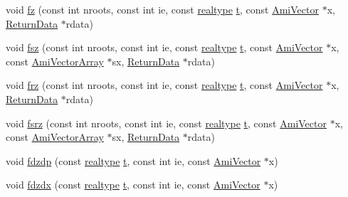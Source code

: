 \begin{DoxyCompactItemize}
void \mbox{\hyperlink{classamici_1_1_model_a34f0ec7e922c0817b08d0021dba9c36f}{fz}} (const int nroots, const int ie, const \mbox{\hyperlink{namespaceamici_a1bdce28051d6a53868f7ccbf5f2c14a3}{realtype}} \mbox{\hyperlink{classamici_1_1_model_a711281d57e9710226face29151cc4641}{t}}, const \mbox{\hyperlink{classamici_1_1_ami_vector}{Ami\+Vector}} $\ast$x, \mbox{\hyperlink{classamici_1_1_return_data}{Return\+Data}} $\ast$rdata)
\item 
void \mbox{\hyperlink{classamici_1_1_model_ae977a1364eb91b11b7a1f6f63c0c4547}{fsz}} (const int nroots, const int ie, const \mbox{\hyperlink{namespaceamici_a1bdce28051d6a53868f7ccbf5f2c14a3}{realtype}} \mbox{\hyperlink{classamici_1_1_model_a711281d57e9710226face29151cc4641}{t}}, const \mbox{\hyperlink{classamici_1_1_ami_vector}{Ami\+Vector}} $\ast$x, const \mbox{\hyperlink{classamici_1_1_ami_vector_array}{Ami\+Vector\+Array}} $\ast$sx, \mbox{\hyperlink{classamici_1_1_return_data}{Return\+Data}} $\ast$rdata)
\item 
void \mbox{\hyperlink{classamici_1_1_model_a8a033ace9618ccc4c72d2956f0bf79ac}{frz}} (const int nroots, const int ie, const \mbox{\hyperlink{namespaceamici_a1bdce28051d6a53868f7ccbf5f2c14a3}{realtype}} \mbox{\hyperlink{classamici_1_1_model_a711281d57e9710226face29151cc4641}{t}}, const \mbox{\hyperlink{classamici_1_1_ami_vector}{Ami\+Vector}} $\ast$x, \mbox{\hyperlink{classamici_1_1_return_data}{Return\+Data}} $\ast$rdata)
\item 
void \mbox{\hyperlink{classamici_1_1_model_a5ddd801e9951f8057c2cfd8c66a27c42}{fsrz}} (const int nroots, const int ie, const \mbox{\hyperlink{namespaceamici_a1bdce28051d6a53868f7ccbf5f2c14a3}{realtype}} \mbox{\hyperlink{classamici_1_1_model_a711281d57e9710226face29151cc4641}{t}}, const \mbox{\hyperlink{classamici_1_1_ami_vector}{Ami\+Vector}} $\ast$x, const \mbox{\hyperlink{classamici_1_1_ami_vector_array}{Ami\+Vector\+Array}} $\ast$sx, \mbox{\hyperlink{classamici_1_1_return_data}{Return\+Data}} $\ast$rdata)
\item 
void \mbox{\hyperlink{classamici_1_1_model_a0be0b4d550d53eebd0e35c65f1b1bbc6}{fdzdp}} (const \mbox{\hyperlink{namespaceamici_a1bdce28051d6a53868f7ccbf5f2c14a3}{realtype}} \mbox{\hyperlink{classamici_1_1_model_a711281d57e9710226face29151cc4641}{t}}, const int ie, const \mbox{\hyperlink{classamici_1_1_ami_vector}{Ami\+Vector}} $\ast$x)
\item 
void \mbox{\hyperlink{classamici_1_1_model_add010f6b76558fb38611b5a79612a547}{fdzdx}} (const \mbox{\hyperlink{namespaceamici_a1bdce28051d6a53868f7ccbf5f2c14a3}{realtype}} \mbox{\hyperlink{classamici_1_1_model_a711281d57e9710226face29151cc4641}{t}}, const int ie, const \mbox{\hyperlink{classamici_1_1_ami_vector}{Ami\+Vector}} $\ast$x)

\end{DoxyCompactItemize}
